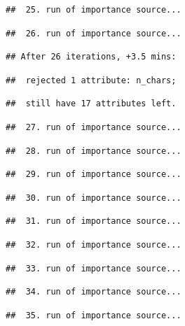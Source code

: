 \documentclass[
]{article}
\begin{document}
\begin{verbatim}
##  25. run of importance source...
\end{verbatim}

\begin{verbatim}
##  26. run of importance source...
\end{verbatim}

\begin{verbatim}
## After 26 iterations, +3.5 mins:
\end{verbatim}

\begin{verbatim}
##  rejected 1 attribute: n_chars;
\end{verbatim}

\begin{verbatim}
##  still have 17 attributes left.
\end{verbatim}

\begin{verbatim}
##  27. run of importance source...
\end{verbatim}

\begin{verbatim}
##  28. run of importance source...
\end{verbatim}

\begin{verbatim}
##  29. run of importance source...
\end{verbatim}

\begin{verbatim}
##  30. run of importance source...
\end{verbatim}

\begin{verbatim}
##  31. run of importance source...
\end{verbatim}

\begin{verbatim}
##  32. run of importance source...
\end{verbatim}

\begin{verbatim}
##  33. run of importance source...
\end{verbatim}

\begin{verbatim}
##  34. run of importance source...
\end{verbatim}

\begin{verbatim}
##  35. run of importance source...
\end{verbatim}
\end{document}
